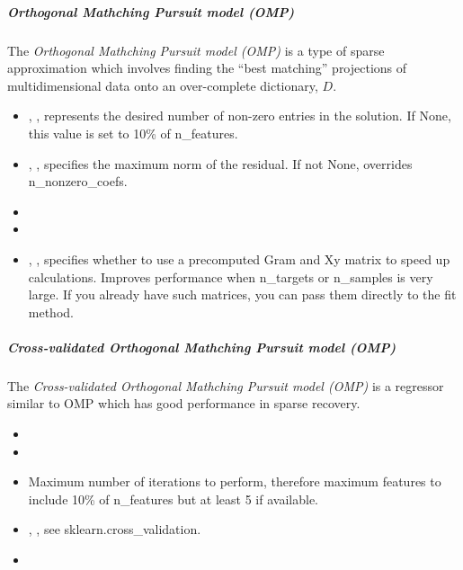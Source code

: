 \subparagraph{Orthogonal Mathching Pursuit model (OMP)}
\mbox{}

The \textit{Orthogonal Mathching Pursuit model (OMP)} is a type of sparse
approximation which involves finding the ``best matching'' projections of
multidimensional data onto an over-complete dictionary, $D$.
%
\begin{itemize}
  \item {}, , represents
  the desired number of non-zero entries in the solution.
  If None, this value is set to 10\% of n\_features.
  \item {}, , specifies the maximum
  norm of the residual.
  If not None, overrides n\_nonzero\_coefs.
  \item {}
  \item {}
  \item {}, , specifies
  whether to use a precomputed Gram and Xy matrix to speed up calculations.
  Improves performance when n\_targets or n\_samples is very large.
  \nb If you already have such matrices, you can pass them directly to the
  fit method.
\end{itemize}

\subparagraph{Cross-validated Orthogonal Mathching Pursuit model (OMP)}
\mbox{}

The \textit{Cross-validated Orthogonal Mathching Pursuit model (OMP)} is a
regressor similar to OMP which has good performance in sparse recovery.
%
\begin{itemize}
  \item {}
  \item {}
  \item \maxIterDescription{}
  Maximum number of iterations to perform, therefore maximum features to
  include 10\% of n\_features but at least 5 if available.
  \item {}, ,
  see sklearn.cross\_validation.
  \item \verDescriptionB{}
\end{itemize}

